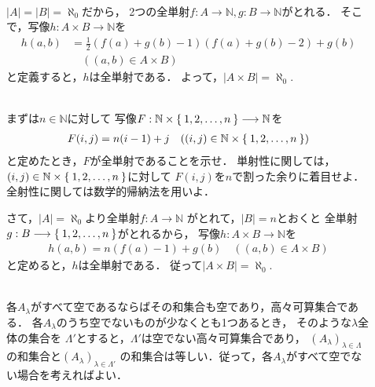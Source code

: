 \begin{description}
\item[] \mbox{} \\
  $\lvert A \rvert = \lvert B \rvert = \aleph _0$だから，
  2つの全単射$f: A \longrightarrow \mathbb{N} , 
  g: B \longrightarrow \mathbb{N}$がとれる．
  そこで，写像$h: A \times B \longrightarrow \mathbb{N}$を
  \begin{align*}
    h(a,b) & = \frac{1}{2} ( f(a) + g(b) -1)( f(a) + g(b) -2) + g(b) \\
           & \quad ( (a,b) \in A \times B )
  \end{align*}
  と定義すると，$h$は全単射である．
  よって，$\lvert A \times B \rvert = \aleph _0 .$

\item[] \mbox{} \\
  まずは$n \in \mathbb{N}$に対して
  写像$F : \mathbb{N} \times \Set{ 1,2, \ldots , n} \longrightarrow \mathbb{N}$を
  \begin{align*}
    F ( i, j ) = n(i-1) + j \quad ( ( i,j) \in \mathbb{N} \times \Set{ 1,2, \ldots , n})
  \end{align*}
  と定めたとき，$F$が全単射であることを示せ．
  単射性に関しては，
  $(i,j) \in \mathbb{N} \times \Set{1,2,\ldots , n}$に対して
  $F(i,j)$を$n$で割った余りに着目せよ．
  全射性に関しては数学的帰納法を用いよ．

  さて，$\lvert A \rvert = \aleph _ 0$より全単射$f: A \longrightarrow \mathbb{N}$
  がとれて，$\lvert B \rvert = n$とおくと
  全単射$g: B \longrightarrow \Set{ 1,2, \ldots , n}$がとれるから，
  写像$h: A \times B \longrightarrow \mathbb{N}$を
  \begin{align*}
    h(a,b) = n ( f(a)-1) + g(b) \quad ( (a,b) \in A \times B)
  \end{align*}
  と定めると，$h$は全単射である．
  従って$\lvert A \times B \rvert = \aleph _0 .$

\item[] \mbox{} \\
  各$A_{\lambda}$がすべて空であるならばその和集合も空であり，高々可算集合である．
  各$A_{\lambda}$のうち空でないものが少なくとも1つあるとき，
  そのような$\lambda$全体の集合を
  $\varLambda '$とすると，$\varLambda '$は空でない高々可算集合であり，
  $(A_{\lambda})_{\lambda \in \varLambda}$の和集合と$(A_{\lambda})_{\lambda \in \varLambda '}$
  の和集合は等しい．従って，各$A_{\lambda}$がすべて空でない場合を考えればよい．


\end{description}
